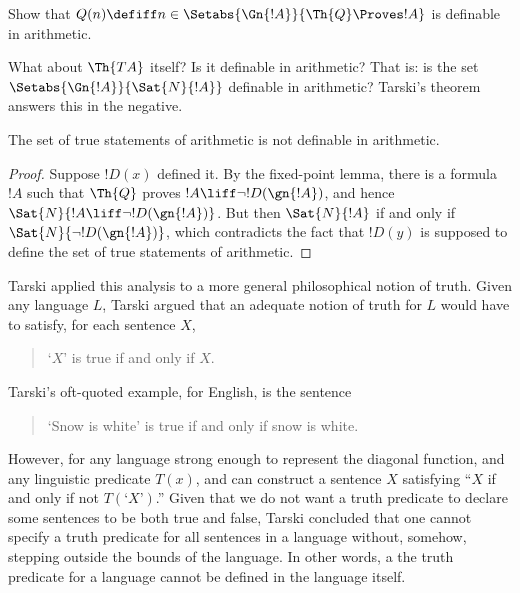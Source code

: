 \documentclass[../../include/open-logic-section]{subfiles}
\begin{document}
\begin{prob}
Show that $Q(n) \defiff n \in \Setabs{\Gn{!A}}{\Th{Q} \Proves !A}$ is
  definable in arithmetic.
\end{prob}

What about $\Th{TA}$ itself? Is it definable in arithmetic? That
is: is the set $\Setabs{\Gn{!A}}{\Sat{N}{!A}}$ definable in
arithmetic? Tarski's theorem answers this in the negative.

\begin{thm}
The set of true statements of arithmetic is not definable in arithmetic.
\end{thm}

\begin{proof} 
Suppose $!D(x)$ defined it. By the fixed-point lemma, there is a
formula $!A$ such that $\Th{Q}$ proves $!A \liff \lnot !D(\gn{!A})$,
and hence $\Sat{N}{!A \liff \lnot !D(\gn{!A})}$. But then
$\Sat{N}{!A}$ if and only if $\Sat{N}{\lnot !D(\gn{!A})}$, which
contradicts the fact that $!D(y)$ is supposed to define the set of true
statements of arithmetic.  
\end{proof}

Tarski applied this analysis to a more general philosophical notion of
truth. Given any language $L$, Tarski argued that an adequate notion
of truth for $L$ would have to satisfy, for each sentence $X$,
\begin{quote}
`$X$' is true if and only if $X$.
\end{quote}
Tarski's oft-quoted example, for English, is the sentence
\begin{quote}
`Snow is white' is true if and only if snow is white.
\end{quote}
However, for any language strong enough to represent the diagonal
function, and any linguistic predicate $T(x)$, and can construct a
sentence $X$ satisfying ``$X$ if and only if not $T(\text{`$X$'})$.''
Given that we do not want a truth predicate to declare some sentences
to be both true and false, Tarski concluded that one cannot specify a
truth predicate for all sentences in a language without, somehow,
stepping outside the bounds of the language. In other words, a the
truth predicate for a language cannot be defined in the language
itself.
\end{document}
